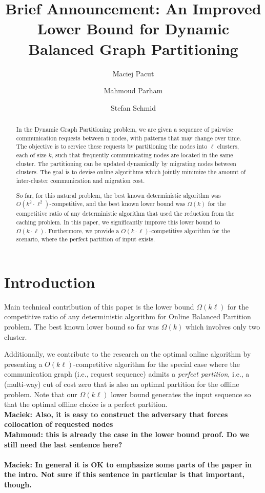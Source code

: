 \documentclass[manuscript,screen=true]{acmart}
\title{Brief Announcement: An Improved Lower Bound for Dynamic Balanced Graph Partitioning}
\author{Maciej Pacut}
\affiliation{%
  \department{Faculty of Computer Science}
  \institution{University of Vienna}
  \country{Austria}
}
\author{Mahmoud Parham}
\affiliation{%
  \department{Faculty of Computer Science}
  \institution{University of Vienna}
  \country{Austria}
}
\author{Stefan Schmid}
\affiliation{%
  \department{Faculty of Computer Science}
  \institution{University of Vienna}
  \country{Austria}
}
\newcommand\mahmoud[1]{\color{green}\textbf{\\ Mahmoud: #1}\\\color{black}}
\newcommand\maciek[1]{\color{brown}\textbf{\\ Maciek: #1}\color{black}}
\begin{document}
\begin{abstract}
  In the Dynamic Graph Partitioning problem, we are given a sequence of pairwise communication requests between n nodes, with patterns that may change over time.
  The objective is to service these requests by partitioning the nodes into $\ell$ clusters, each of size $k$, such that frequently communicating nodes are located in the same cluster.
  The partitioning can be updated dynamically by migrating nodes between clusters.
  The goal is to devise online algorithms which jointly minimize the amount of inter-cluster communication and migration cost.

  So far, for this natural problem, the best known deterministic algorithm was $O(k^2\cdot \ell^2)$-competitive, and the best known lower bound was $\Omega(k)$ for the competitive ratio of any deterministic algorithm that used the reduction from the caching problem.
  In this paper, we significantly improve this lower bound to $\Omega(k\cdot \ell)$.
  Furthermore, we provide a $O(k\cdot \ell)$-competitive algorithm for the scenario, where the perfect partition of input exists.
\end{abstract}
    
\maketitle
    
\renewcommand{\shortauthors}{M.~Pacut, M.~Parham, S.~Schmid}

\section{Introduction}

Main technical contribution of this paper is the lower bound $\Omega(k\ell)$ for the competitive ratio of any deterministic algorithm for Online Balanced Partition problem.
The best known lower bound so far was $\Omega(k)$ \cite{repartition-disc}
which involves only two cluster.


Additionally, we contribute to the research on the optimal online algorithm by presenting a $O(k\ell)$-competitive algorithm for the special case
where the communication graph (i.e., request sequence) admits a \emph{perfect partition},
i.e., a (multi-way) cut of cost zero that is also an optimal partition for the offline problem.
Note that our $\Omega(k\ell)$ lower bound generates the input sequence
so that the optimal offline choice is a perfect partition.
\maciek{Also, it is easy to construct the adversary that forces collocation of requested nodes}
\mahmoud{this is already the case in the lower bound proof. Do we still need the last sentence here?}
\maciek{In general it is OK to emphasize some parts of the paper in the intro. Not sure if this sentence in particular is that important, though.}
\end{document}
